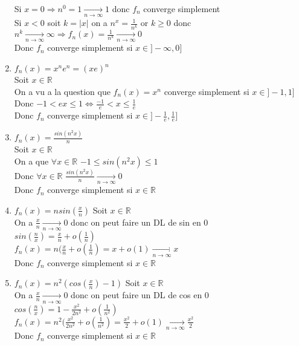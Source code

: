 \documentclass{article}
\newcommand{\mylim}[2]{\underset{#1 \rightarrow #2}{\longrightarrow}}
\begin{document}
\begin{enumerate}[label=\alph*)]
        Si $x = 0 \Rightarrow n^0 = 1 \mylim{n}{\infty} 1$ donc $f_n$ converge simplement\\
        Si $x < 0$ soit $k = |x|$ on a $n^x = \frac{1}{n^k}$ or $k \geq 0$ donc $n^k \mylim{n}{\infty} \infty \Rightarrow f_n(x) = \frac{1}{n^k} \mylim{n}{\infty} 0$\\
        Donc $f_n$ converge simplement si $x \in ]-\infty, 0]$
    \newpage    
    \item $f_n(x) = x^n e^n = (xe)^n$\\
    Soit $x \in \mathbb{R}$\\
    On a vu a la question que $f_n(x) = x^n$ converge simplement si $x \in ]-1, 1]$\\
    Donc $-1 < ex \leq 1 \Leftrightarrow \frac{-1}{e} < x \leq \frac{1}{e}$\\
    Donc $f_n$ converge simplement si $x \in ]-\frac{1}{e}, \frac{1}{e}]$
    \item $f_n(x) = \frac{sin(n^2x)}{n}$\\
    Soit $x \in \mathbb{R}$\\
    On a que $\forall x \in \mathbb{R}$ $-1 \leq sin(n^2x) \leq 1$\\
    Donc $\forall x \in \mathbb{R}$ $\frac{sin(n^2x)}{n} \mylim{n}{\infty} 0$\\
    Donc $f_n$ converge simplement si $x \in \mathbb{R}$
    \item $f_n(x) = n sin(\frac{x}{n})$
    Soit $x \in \mathbb{R}$\\
    On a $\frac{x}{n} \mylim{n}{\infty} 0$ donc on peut faire un DL de sin en 0\\
    $sin(\frac{n}{x}) = \frac{x}{n} + o(\frac{1}{n})$\\
    $f_n(x) = n (\frac{x}{n} + o(\frac{1}{n}) = x + o(1) \mylim{n}{\infty} x$\\
    Donc $f_n$ converge simplement si $x \in \mathbb{R}$
    \item $f_n(x) = n^2(cos(\frac{x}{n}) - 1)$
    Soit $x \in \mathbb{R}$\\
    On a $\frac{x}{n} \mylim{n}{\infty} 0$ donc on peut faire un DL de cos en 0\\
    $cos(\frac{n}{x}) = 1 - \frac{x^2}{2n^2} + o(\frac{1}{n^2})$\\
    $f_n(x) = n^2 (\frac{x^2}{2n^2} + o(\frac{1}{n^2}) = \frac{x^2}{2} + o(1) \mylim{n}{\infty} \frac{x^2}{2}$\\
    Donc $f_n$ converge simplement si $x \in \mathbb{R}$
\end{enumerate}
\end{document}
